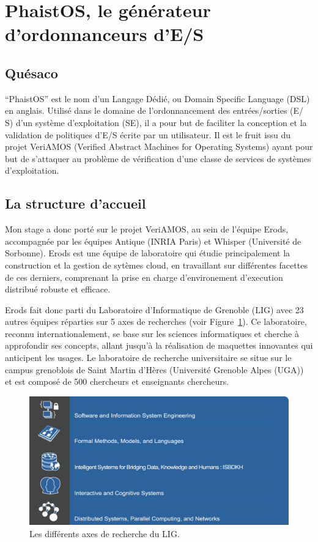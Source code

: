 \section{PhaistOS, le générateur d'ordonnanceurs d'E/S}
\label{intro}

\subsection{Quésaco}

``PhaistOS'' est le nom d'un Langage Dédié, ou Domain Specific Language (DSL) 
en anglais. Utilisé dans le domaine de l'ordonnancement des entrées/sorties (E/
S) d'un système d'exploitation (SE), il a pour but de faciliter la conception 
et la validation de politiques d'E/S écrite par un utilisateur. Il est le 
fruit issu du projet VeriAMOS (Verified Abstract Machines for Operating 
Systems) ayant pour but de s'attaquer au problème de vérification d'une classe 
de services de systèmes d'exploitation.

\subsection{La structure d'accueil}

Mon stage a donc porté sur le projet VeriAMOS, au sein de l'équipe Erods, 
accompagnée par les équipes Antique (INRIA Paris) et Whisper (Université de 
Sorbonne). Erods est une équipe de laboratoire qui étudie principalement la 
construction et la gestion de sytèmes cloud, en travaillant sur différentes 
facettes de ces derniers, comprenant la prise en charge d'environement 
d'execution distribué robuste et efficace. 

Erods fait donc parti du Laboratoire d'Informatique de Grenoble (LIG) avec 23 
autres équipes réparties sur 5 axes de recherches (voir Figure~\ref{fig:lig}). 
Ce laboratoire, reconnu internationalement, se base sur les sciences 
informatiques et cherche à approfondir ses concepts, allant jusqu'à la 
réalisation de maquettes innovantes qui anticipent les usages. Le laboratoire 
de recherche universitaire se situe sur le campus grenoblois de Saint Martin 
d'Hères (Université Grenoble Alpes (UGA)) et est composé de 500 chercheurs et 
enseignants chercheurs.

\begin{figure}[h!t] \centering
    \includegraphics[width=12.5cm]{images/axeslig}
    \caption{Les différents axes de recherche du LIG.}
    \label{fig:lig}
\end{figure}

